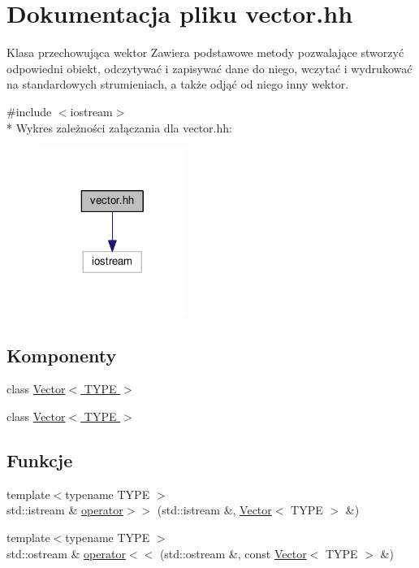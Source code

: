 \hypertarget{vector_8hh}{\section{Dokumentacja pliku vector.\-hh}
\label{vector_8hh}
}


Klasa przechowująca wektor Zawiera podstawowe metody pozwalające stworzyć odpowiedni obiekt, odczytywać i zapisywać dane do niego, wczytać i wydrukować na standardowych strumieniach, a także odjąć od niego inny wektor.  


{\ttfamily \#include $<$iostream$>$}\\*
Wykres zależności załączania dla vector.\-hh\-:\nopagebreak
\begin{figure}[H]
\begin{center}
\leavevmode
\includegraphics[width=136pt]{vector_8hh__incl}
\end{center}
\end{figure}
\subsection*{Komponenty}
\begin{DoxyCompactItemize}
\item 
class \hyperlink{class_vector}{Vector$<$ T\-Y\-P\-E $>$}
\item 
class \hyperlink{class_vector}{Vector$<$ T\-Y\-P\-E $>$}
\end{DoxyCompactItemize}
\subsection*{Funkcje}
\begin{DoxyCompactItemize}
\item 
{\footnotesize template$<$typename T\-Y\-P\-E $>$ }\\std\-::istream \& \hyperlink{vector_8hh_af9f1d76a42b7800e17a6da47fce9e179}{operator$>$$>$} (std\-::istream \&, \hyperlink{class_vector}{Vector}$<$ T\-Y\-P\-E $>$ \&)
\item 
{\footnotesize template$<$typename T\-Y\-P\-E $>$ }\\std\-::ostream \& \hyperlink{vector_8hh_aebb7c04457be6d2378fa43ce22cfb408}{operator$<$$<$} (std\-::ostream \&, const \hyperlink{class_vector}{Vector}$<$ T\-Y\-P\-E $>$ \&)
\end{DoxyCompactItemize}


